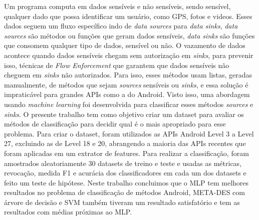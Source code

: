 Um programa computa em dados sensíveis e não sensíveis, sendo sensível, qualquer dado que possa identificar um usuário, como GPS, fotos e videos. Esses dados seguem um fluxo específico indo de \textit{data sources} para \textit{data sinks}, \textit{data sources} são métodos ou funções que geram dados sensíveis, \textit{data sinks} são funções que consomem qualquer tipo de dados, sensível ou não. O vazamento de dados acontece quando dados sensíveis chegam sem autorização em \textit{sinks}, para prevenir isso, técnicas de \textit{Flow Enforcement} que garantem que dados sensíveis não cheguem em \textit{sinks} não autorizados. Para isso, esses métodos usam listas, geradas manualmente, de métodos que sejam \textit{sources} sensíveis ou \textit{sinks}, e essa solução é impraticável para grandes APIs como a do Android. Visto isso, uma abordagem usando \textit{machine learning} foi desenvolvida para classificar esses métodos \textit{sources} e \textit{sinks}. O presente trabalho tem como objetivo criar um dataset para avaliar os métodos de classificação para decidir qual é o mais apropriado para esse problema. Para criar o dataset, foram utilizados as APIs Android Level 3 a Level 27, excluindo as de Level 18 e 20, abrangendo a maioria das APIs recentes que foram aplicadas em um extrator de features. Para realizar a classificação, foram amostrados aleatoriamente 30 datasets de treino e teste e usadas as métricas, revocação, medida F1 e acurácia dos classificadores em cada um dos datasets e feito um teste de hipótese. Neste trabalho concluimos que o MLP tem melhores resultados no problema de classificação de métodos Android, META-DES com árvore de decisão e SVM também tiveram um resultado satisfatório e tem as resultados com médias próximas ao MLP.
